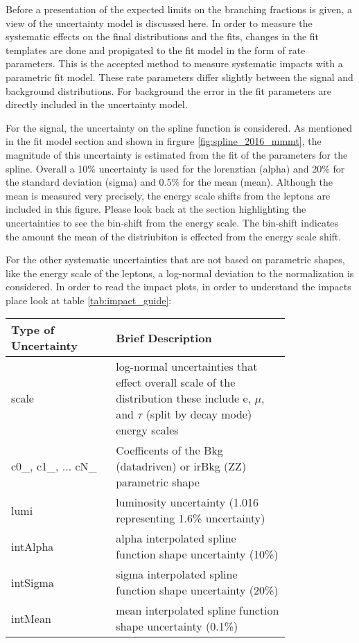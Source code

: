 Before a presentation of the expected limits on the branching fractions is given, a view of the uncertainty model is discussed here. 
In order to measure the systematic effects on the final distributions and the fits, changes in the fit templates are done and propigated to the fit model in the form of rate parameters. This is the accepted method to measure systematic impacts with a parametric fit model. These rate parameters differ slightly between the signal and background distributions. 
For background the error in the fit parameters are directly included in the uncertainty model. 

For the signal, the uncertainty on the spline function is considered. As mentioned in the fit model section and shown in firgure \ref{fig:spline_2016_mmmt}, the magnitude of this uncertainty is estimated from the fit of the parameters for the spline. Overall a 10\% uncertainty is used for the lorenztian (alpha) and 20\% for the standard deviation (sigma) and 0.5\% for the mean (mean). Although the mean is measured very precisely, the energy scale shifts from the leptons are included in this figure. Please look back at the section highlighting the uncertainties to see the bin-shift from the energy scale. The bin-shift indicates the amount the mean of the distriubiton is effected from the energy scale shift.  


For the other systematic uncertainties that are not based on parametric shapes, like the energy scale of the leptons, a log-normal deviation to the normalization is considered. 
In order to read the impact plots, in order to understand the impacts place look at table \ref{tab:impact_guide}:

\begin{table}[h!tb]
\centering
\topcaption{
\label{tab:impact_guide}
}
\begin{tabular}{|p{0.3\linewidth}|p{0.5\linewidth}|}
\hline  
Type of Uncertainty & Brief Description \\\hline
scale & log-normal uncertainties that effect overall scale of the distribution these include e, $\mu$, and $\tau$ (split by decay mode) energy scales  \\\hline
 c0\_, c1\_, ... cN\_& Coefficents of the Bkg (datadriven) or irBkg (ZZ) parametric shape \\\hline
lumi & luminosity uncertainty (1.016 representing 1.6\% uncertainty) \\\hline
intAlpha & alpha interpolated spline function shape uncertainty (10\%) \\\hline
intSigma & sigma interpolated spline function shape uncertainty (20\%) \\\hline
intMean & mean interpolated spline function shape uncertainty (0.1\%) \\\hline
\end{tabular}
\end{table}
\clearpage 

